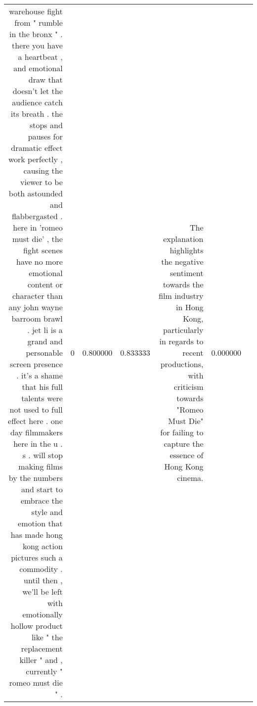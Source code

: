 \begin{tabular}{rlrrrlr}
warehouse fight from " rumble in the bronx " .  there you have a heartbeat , and emotional draw that doesn't let the audience catch its breath .  the stops and pauses for dramatic effect work perfectly , causing the viewer to be both astounded and flabbergasted .  here in 'romeo must die' , the fight scenes have no more emotional content or character than any john wayne barroom brawl .  jet li is a grand and personable screen presence .  it's a shame that his full talents were not used to full effect here .  one day filmmakers here in the u . s . will stop making films by the numbers and start to embrace the style and emotion that has made hong kong action pictures such a commodity .  until then , we'll be left with emotionally hollow product like " the replacement killer " and , currently " romeo must die " .   & 0 & 0.800000 & 0.833333 & The explanation highlights the negative sentiment towards the film industry in Hong Kong, particularly in regards to recent productions, with criticism towards "Romeo Must Die" for failing to capture the essence of Hong Kong cinema. & 0.000000 \\

\end{tabular}
